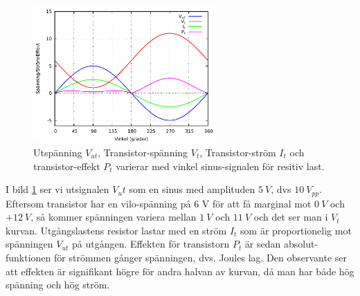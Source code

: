 \begin{figure}[h]
\begin{center}
\includegraphics[width=7cm]{images/power1}
\caption{Utspänning $V_{ut}$, Transistor-spänning $V_t$, Transistor-ström $I_t$ och transistor-effekt $P_t$ varierar med vinkel sinus-signalen för resitiv last.}
\label{fig:power1}
\end{center}
\end{figure}

I bild \ref{fig:power1} ser vi utsignalen \(V_ut\) som en sinus med amplituden
\(5\ V\), dvs \(10\ V_{pp}\). Eftersom transistor har en vilo-spänning på 6 V
för att få marginal mot \(0\ V\) och \(+12\ V\), så kommer spänningen variera
mellan \(1\ V\) och \(11\ V\) och det ser man i \(V_t\) kurvan. Utgångslastens
resistor lastar med en ström \(I_t\) som är proportionelig mot spänningen
\(V_{ut}\) på utgången. Effekten för transistorn \(P_t\) är sedan absolut-
funktionen för strömmen gånger spänningen, dvs. Joules lag. Den observante ser
att effekten är signifikant högre för andra halvan av kurvan, då man har både
hög spänning och hög ström.
